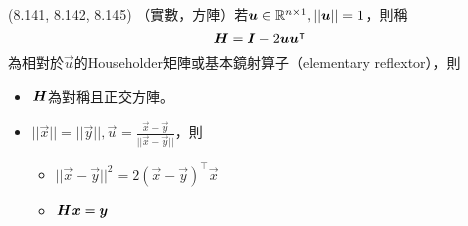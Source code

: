 \item \begin{theorem}{(8.141, 8.142, 8.145)} （實數，方陣）若$\boldsymbol{u} \in \mathbb{R}^{n \times 1}, ||\boldsymbol{u}|| = 1$，則稱
	\begin{equation}
		\boldsymbol{H} = \boldsymbol{I} - 2\boldsymbol{uu}^\intercal
	\end{equation}
	為相對於$\vec{u}$的Householder矩陣或基本鏡射算子（elementary reflextor），則
	\begin{itemize}
		\item $\boldsymbol{H}$為對稱且正交方陣。
		\item $||\vec{x}|| = ||\vec{y}||, \vec{u} = \frac{\vec{x} - \vec{y}}{||\vec{x} - \vec{y}||}$，則
		\begin{itemize}
			\item $||\vec{x} - \vec{y}||^2 = 2(\vec{x} - \vec{y})^\intercal\vec{x}$
			\item $\boldsymbol{H}\boldsymbol{x} = \boldsymbol{y}$
		\end{itemize}
	\end{itemize}
\end{theorem}

